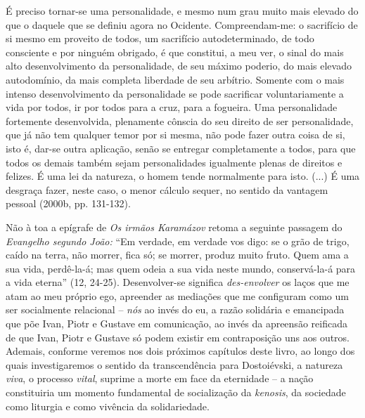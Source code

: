 É preciso tornar-se uma personalidade, e mesmo num grau muito mais
elevado do que o daquele que se definiu agora no Ocidente.
Compreendam-me: o sacrifício de si mesmo em proveito de todos, um
sacrifício autodeterminado, de todo consciente e por ninguém obrigado, é
que constitui, a meu ver, o sinal do mais alto desenvolvimento da
personalidade, de seu máximo poderio, do mais elevado autodomínio, da
mais completa liberdade de seu arbítrio. Somente com o mais intenso
desenvolvimento da personalidade se pode sacrificar voluntariamente a
vida por todos, ir por todos para a cruz, para a fogueira. Uma
personalidade fortemente desenvolvida, plenamente cônscia do seu direito
de ser personalidade, que já não tem qualquer temor por si mesma, não
pode fazer outra coisa de si, isto é, dar-se outra aplicação, senão se
entregar completamente a todos, para que todos os demais também sejam
personalidades igualmente plenas de direitos e felizes. É uma lei da
natureza, o homem tende normalmente para isto. (...) É uma desgraça
fazer, neste caso, o menor cálculo sequer, no sentido da vantagem
pessoal (2000b, pp. 131-132).

Não à toa a epígrafe de \emph{Os irmãos Karamázov} retoma a seguinte
passagem do \emph{Evangelho segundo João:} ``Em verdade, em verdade vos
digo: se o grão de trigo, caído na terra, não morrer, fica só; se
morrer, produz muito fruto. Quem ama a sua vida, perdê-la-á; mas quem
odeia a sua vida neste mundo, conservá-la-á para a vida eterna'' (12,
24-25). Desenvolver-se significa \emph{des-envolver} os laços que me
atam ao meu próprio ego, apreender as mediações que me configuram como
um ser socialmente relacional -- \emph{nós} ao invés do eu, a razão
solidária e emancipada que põe Ivan, Piotr e Gustave em comunicação, ao
invés da apreensão reificada de que Ivan, Piotr e Gustave só podem
existir em contraposição uns aos outros. Ademais, conforme veremos nos
dois próximos capítulos deste livro, ao longo dos quais investigaremos o
sentido da transcendência para Dostoiévski, a natureza \emph{viva}, o
processo \emph{vital}, suprime a morte em face da eternidade -- a nação
constituiria um momento fundamental de socialização da \emph{kenosis},
da sociedade como liturgia e como vivência da solidariedade.


